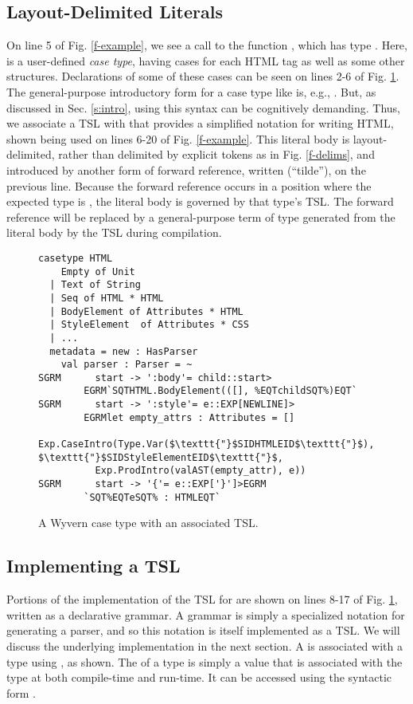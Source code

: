 \subsection{Layout-Delimited Literals}
On line 5 of Fig. \ref{f-example}, we see a call to the function , which has type . Here,  is a user-defined \emph{case type}, having cases for each HTML tag as well as some other structures. Declarations  of some of these cases can be seen on lines 2-6 of Fig. \ref{f-htmltype}. The general-purpose introductory form for a case type like  is, e.g., . But, as discussed in Sec. \ref{s:intro}, using this syntax can be cognitively demanding. Thus, we associate a TSL with  that provides a simplified notation for writing HTML, shown being used on lines 6-20 of Fig. \ref{f-example}. This literal body is layout-delimited, rather than delimited by explicit tokens as in Fig. \ref{f-delims}, and introduced by another form of forward reference, written \li{~} (``tilde''), on the previous line. Because the forward reference occurs in a position where the expected type is , the literal body is governed by that type's TSL. The forward reference will be replaced by a general-purpose term of type  generated from the literal body by the TSL during compilation.
\begin{figure}[t]
\begin{lstlisting}[escapechar=$]
casetype HTML 
    Empty of Unit
  | Text of String
  | Seq of HTML * HTML 
  | BodyElement of Attributes * HTML
  | StyleElement  of Attributes * CSS
  | ...
  metadata = new : HasParser
    val parser : Parser = ~
SGRM      start -> ':body'= child::start>
        EGRM`SQTHTML.BodyElement(([], %EQTchildSQT%)EQT`
SGRM      start -> ':style'= e::EXP[NEWLINE]>
        EGRMlet empty_attrs : Attributes = []
        Exp.CaseIntro(Type.Var($\texttt{"}$SIDHTMLEID$\texttt{"}$), $\texttt{"}$SIDStyleElementEID$\texttt{"}$,
          Exp.ProdIntro(valAST(empty_attr), e))
SGRM      start -> '{'= e::EXP['}']>EGRM
        `SQT%EQTeSQT% : HTMLEQT`
\end{lstlisting}
\vspace{-8px}
\caption{A Wyvern case type with an associated TSL.}
\vspace{-10px}
\label{f-htmltype}
\end{figure}

\subsection{Implementing a TSL}
Portions of the implementation of the TSL for  are shown on lines 8-17 of Fig. \ref{f-htmltype}, written as a declarative grammar. A grammar is simply a specialized notation for generating a parser, and so this notation is itself implemented as a TSL. We will discuss the underlying implementation in the next section. A  is associated with a type using , as shown. The  of a type  is simply a value that is associated with the type at both compile-time and run-time. It can be accessed using the syntactic form .

